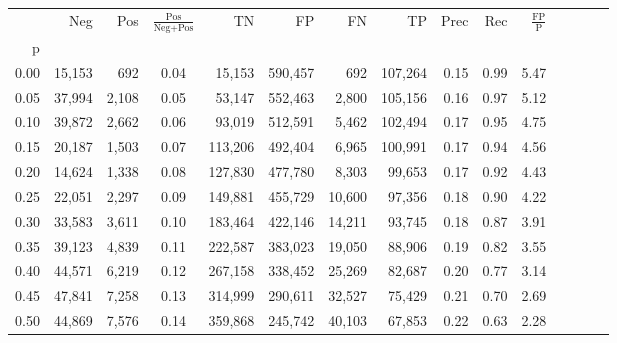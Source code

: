 \begin{tabular}{rrrcrrrrrrrrrrr}
\toprule
{} &     Neg &    Pos & $\frac{\text{Pos}}{\text{Neg}+\text{Pos}}$ &       TN &       FP &       FN &       TP &  Prec &   Rec & $\frac{\text{FP}}{\text{P}}$ \\
p    &         &        &                                            &          &          &          &          &       &       &                              \\
\midrule
0.00 &  15,153 &    692 &                                       0.04 &   15,153 &  590,457 &      692 &  107,264 &  0.15 &  0.99 &                         5.47 \\
0.05 &  37,994 &  2,108 &                                       0.05 &   53,147 &  552,463 &    2,800 &  105,156 &  0.16 &  0.97 &                         5.12 \\
0.10 &  39,872 &  2,662 &                                       0.06 &   93,019 &  512,591 &    5,462 &  102,494 &  0.17 &  0.95 &                         4.75 \\
0.15 &  20,187 &  1,503 &                                       0.07 &  113,206 &  492,404 &    6,965 &  100,991 &  0.17 &  0.94 &                         4.56 \\
0.20 &  14,624 &  1,338 &                                       0.08 &  127,830 &  477,780 &    8,303 &   99,653 &  0.17 &  0.92 &                         4.43 \\
0.25 &  22,051 &  2,297 &                                       0.09 &  149,881 &  455,729 &   10,600 &   97,356 &  0.18 &  0.90 &                         4.22 \\
0.30 &  33,583 &  3,611 &                                       0.10 &  183,464 &  422,146 &   14,211 &   93,745 &  0.18 &  0.87 &                         3.91 \\
0.35 &  39,123 &  4,839 &                                       0.11 &  222,587 &  383,023 &   19,050 &   88,906 &  0.19 &  0.82 &                         3.55 \\
0.40 &  44,571 &  6,219 &                                       0.12 &  267,158 &  338,452 &   25,269 &   82,687 &  0.20 &  0.77 &                         3.14 \\
0.45 &  47,841 &  7,258 &                                       0.13 &  314,999 &  290,611 &   32,527 &   75,429 &  0.21 &  0.70 &                         2.69 \\
0.50 &  44,869 &  7,576 &                                       0.14 &  359,868 &  245,742 &   40,103 &   67,853 &  0.22 &  0.63 &                         2.28 \\

\end{tabular}
